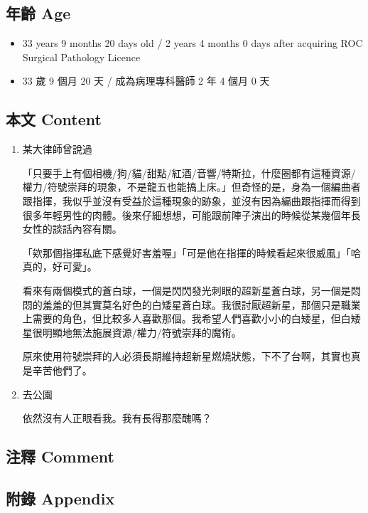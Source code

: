 \documentclass[
]{article}
\providecommand{\tightlist}{%
  \setlength{\itemsep}{0pt}\setlength{\parskip}{0pt}}
\begin{document}
\hypertarget{ux5e74ux9f61-age-11}{%
\subsection{年齡 Age}\label{ux5e74ux9f61-age-11}}

\begin{itemize}
\tightlist
\item
  33 years 9 months 20 days old / 2 years 4 months 0 days after
  acquiring ROC Surgical Pathology Licence
\item
  33 歲 9 個月 20 天 / 成為病理專科醫師 2 年 4 個月 0 天
\end{itemize}

\hypertarget{ux672cux6587-content-11}{%
\subsection{本文 Content}\label{ux672cux6587-content-11}}

\begin{enumerate}
\def\labelenumi{\arabic{enumi}.}
\item
  某大律師曾說過

  「只要手上有個相機/狗/貓/甜點/紅酒/音響/特斯拉，什麼圈都有這種資源/權力/符號崇拜的現象，不是龍五也能搞上床。」但奇怪的是，身為一個編曲者跟指揮，我似乎並沒有受益於這種現象的跡象，並沒有因為編曲跟指揮而得到很多年輕男性的肉體。後來仔細想想，可能跟前陣子演出的時候從某幾個年長女性的談話內容有關。

  「欸那個指揮私底下感覺好害羞喔」「可是他在指揮的時候看起來很威風」「哈真的，好可愛」。

  看來有兩個模式的蒼白球，一個是閃閃發光刺眼的超新星蒼白球，另一個是悶悶的羞羞的但其實莫名好色的白矮星蒼白球。我很討厭超新星，那個只是職業上需要的角色，但比較多人喜歡那個。我希望人們喜歡小小的白矮星，但白矮星很明顯地無法施展資源/權力/符號崇拜的魔術。

  原來使用符號崇拜的人必須長期維持超新星燃燒狀態，下不了台啊，其實也真是辛苦他們了。
\item
  去公園

  依然沒有人正眼看我。我有長得那麼醜嗎？
\end{enumerate}

\hypertarget{ux6ce8ux91cb-comment-11}{%
\subsection{注釋 Comment}\label{ux6ce8ux91cb-comment-11}}

\hypertarget{ux9644ux9304-appendix-11}{%
\subsection{附錄 Appendix}\label{ux9644ux9304-appendix-11}}
\end{document}
